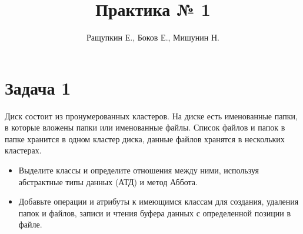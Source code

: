 \documentclass{article}
\begin{document}
\title{Практика № 1}
\author{Ращупкин Е., Боков Е., Мишунин Н.}
\maketitle

\section{Задача 1}
Диск состоит из пронумерованных кластеров. На диске есть именованные папки, в которые вложены папки или именованные файлы. Список файлов и папок в папке хранится в одном кластер диска, данные файлов хранятся в нескольких кластерах.

\begin{itemize}
    \item Выделите классы и определите отношения между ними, используя абстрактные типы данных (АТД) и метод Аббота.
    \item Добавьте операции и атрибуты к имеющимся классам для создания, удаления папок и файлов, записи и чтения буфера данных с определенной позиции в файле.
\end{itemize}
\end{document}
